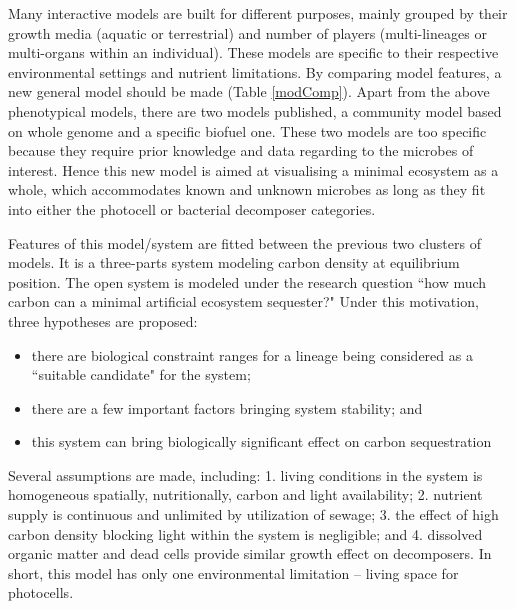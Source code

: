\documentclass[../thesis.tex]{subfiles} %
\begin{document}
Many interactive models are built for different purposes, mainly grouped by their growth media (aquatic or terrestrial) and number of players (multi-lineages or multi-organs within an individual).  These models are specific to their respective environmental settings and nutrient limitations.  By comparing model features, a new general model should be made (Table \ref{modComp}).  Apart from the above phenotypical models, there are two models published, a community model based on whole genome\autocite{harcombe2014metabolic} and a specific biofuel\autocite{kirthiga2014mathematical} one.  These two models are too specific because they require prior knowledge and data regarding to the microbes of interest.  Hence this new model is aimed at visualising a minimal ecosystem as a whole, which accommodates known and unknown microbes as long as they fit into either the photocell or bacterial decomposer categories.

Features of this model/system are fitted between the previous two clusters of models.  It is a three-parts system modeling carbon density at equilibrium position.  The open system is modeled under the research question ``how much carbon can a minimal artificial ecosystem sequester?"  Under this motivation, three hypotheses are proposed:
\begin{itemize}
    \item there are biological constraint ranges for a lineage being considered as a ``suitable candidate" for the system;
    \item there are a few important factors bringing system stability; and
    \item this system can bring biologically significant effect on carbon sequestration
\end{itemize}

Several assumptions are made, including: 1. living conditions in the system is homogeneous spatially, nutritionally, carbon and light availability; 2. nutrient supply is continuous and unlimited by utilization of sewage;\autocite{markou2014microalgal} 3. the effect of high carbon density blocking light within the system is negligible; and 4. dissolved organic matter and dead cells provide similar growth effect on decomposers.  In short, this model has only one environmental limitation -- living space for photocells.
\end{document}
